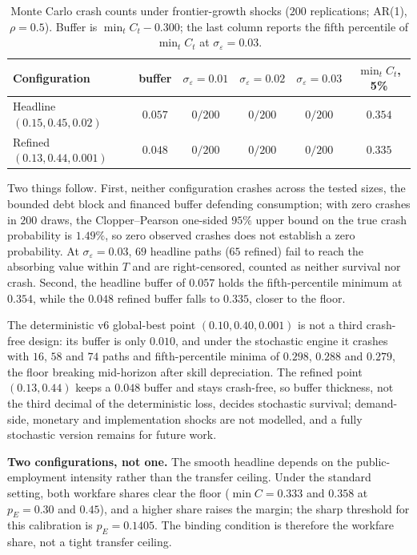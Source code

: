 \documentclass[review,12pt]{elsarticle}
\theoremstyle{plain}
\theoremstyle{definition}
\theoremstyle{remark}
\begin{document}
\begin{table}[htbp]
\centering\small
\caption{Monte Carlo crash counts under frontier-growth shocks ($200$ replications; AR(1), $\rho=0.5$). Buffer is $\min_tC_t-0.300$; the last column reports the fifth percentile of $\min_tC_t$ at $\sigma_\varepsilon=0.03$.}\label{tab:shock}
\begin{tabular}{@{}lccccc@{}}
\toprule
Configuration & buffer & $\sigma_\varepsilon{=}0.01$ & $\sigma_\varepsilon{=}0.02$ & $\sigma_\varepsilon{=}0.03$ & $\min_tC_t$, 5\% \\
\midrule
Headline $(0.15,0.45,0.02)$ & $0.057$ & $0/200$ & $0/200$ & $0/200$ & $0.354$ \\
Refined $(0.13,0.44,0.001)$ & $0.048$ & $0/200$ & $0/200$ & $0/200$ & $0.335$ \\
\bottomrule
\end{tabular}
\end{table}

Two things follow. First, neither configuration crashes across the tested sizes, the bounded debt block and financed buffer defending consumption; with zero crashes in $200$ draws, the Clopper--Pearson one-sided $95\%$ upper bound on the true crash probability is $1.49\%$, so zero observed crashes does not establish a zero probability. At $\sigma_\varepsilon=0.03$, $69$ headline paths ($65$ refined) fail to reach the absorbing value within $T$ and are right-censored, counted as neither survival nor crash. Second, the headline buffer of $0.057$ holds the fifth-percentile minimum at $0.354$, while the $0.048$ refined buffer falls to $0.335$, closer to the floor.

The deterministic v6 global-best point $(0.10,0.40,0.001)$ is not a third crash-free design: its buffer is only $0.010$, and under the stochastic engine it crashes with $16$, $58$ and $74$ paths and fifth-percentile minima of $0.298$, $0.288$ and $0.279$, the floor breaking mid-horizon after skill depreciation. The refined point $(0.13,0.44)$ keeps a $0.048$ buffer and stays crash-free, so buffer thickness, not the third decimal of the deterministic loss, decides stochastic survival; demand-side, monetary and implementation shocks are not modelled, and a fully stochastic version remains for future work.

\smallskip\noindent\textbf{Two configurations, not one.} The smooth headline depends on the public-employment intensity rather than the transfer ceiling. Under the standard setting, both workfare shares clear the floor ($\min C=0.333$ and $0.358$ at $p_E=0.30$ and $0.45$), and a higher share raises the margin; the sharp threshold for this calibration is $p_E=0.1405$. The binding condition is therefore the workfare share, not a tight transfer ceiling.
\end{document}
